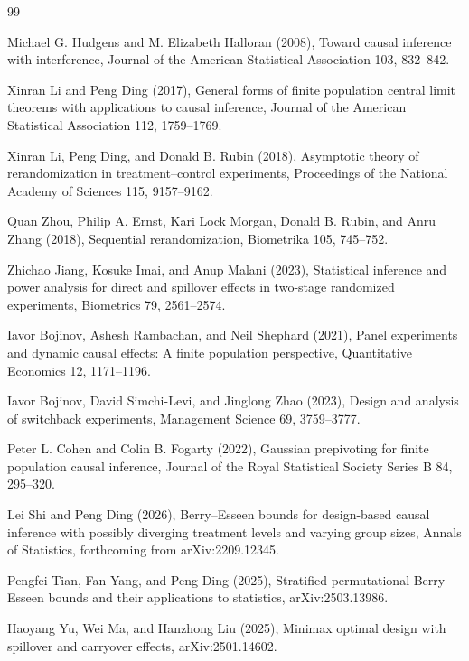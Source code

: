 \documentclass{article}
\begin{document}
\begin{thebibliography}{99}

   Michael G. Hudgens and M. Elizabeth Halloran (2008), Toward causal inference with interference, Journal of the American Statistical Association 103, 832--842.

   Xinran Li and Peng Ding (2017), General forms of finite population central limit theorems with applications to causal inference, Journal of the American Statistical Association 112, 1759--1769.

   Xinran Li, Peng Ding, and Donald B. Rubin (2018), Asymptotic theory of rerandomization in treatment--control experiments, Proceedings of the National Academy of Sciences 115, 9157--9162.

   Quan Zhou, Philip A. Ernst, Kari Lock Morgan, Donald B. Rubin, and Anru Zhang (2018), Sequential rerandomization, Biometrika 105, 745--752.

   Zhichao Jiang, Kosuke Imai, and Anup Malani (2023), Statistical inference and power analysis for direct and spillover effects in two-stage randomized experiments, Biometrics 79, 2561--2574.

   Iavor Bojinov, Ashesh Rambachan, and Neil Shephard (2021), Panel experiments and dynamic causal effects: A finite population perspective, Quantitative Economics 12, 1171--1196.

   Iavor Bojinov, David Simchi-Levi, and Jinglong Zhao (2023), Design and analysis of switchback experiments, Management Science 69, 3759--3777.

   Peter L. Cohen and Colin B. Fogarty (2022), Gaussian prepivoting for finite population causal inference, Journal of the Royal Statistical Society Series B 84, 295--320.

   Lei Shi and Peng Ding (2026), Berry--Esseen bounds for design-based causal inference with possibly diverging treatment levels and varying group sizes, Annals of Statistics, forthcoming from arXiv:2209.12345.

   Pengfei Tian, Fan Yang, and Peng Ding (2025), Stratified permutational Berry--Esseen bounds and their applications to statistics, arXiv:2503.13986.

   Haoyang Yu, Wei Ma, and Hanzhong Liu (2025), Minimax optimal design with spillover and carryover effects, arXiv:2501.14602.


\end{thebibliography}
\end{document}
